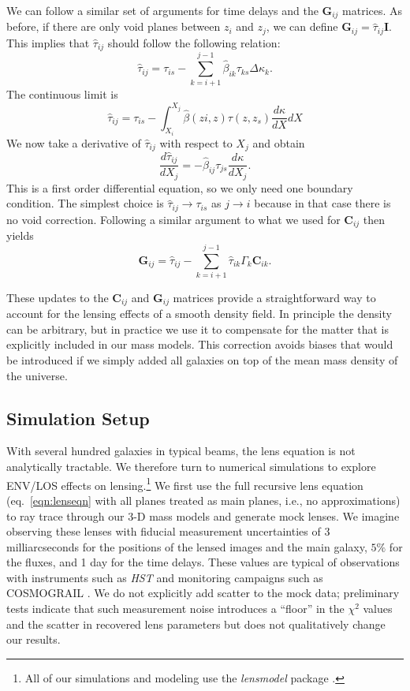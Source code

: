 \documentclass{emulateapj}
\newcommand\C[0]{\mathbf{C}}
\newcommand\I[0]{\mathbf{I}}
\newcommand\G[0]{\mathbf{G}}
\newcommand\betahat{\hat{\beta}}
\newcommand\tauhat{\hat{\tau}}
\begin{document}
We can follow a similar set of arguments for time delays and the $\G_{i j}$ matrices. As before, if there are only void planes between $z_i$ and $z_j$, we can define $\G_{i j} = \tauhat_{i j} \I$. This implies that $\tauhat_{i j}$ should follow the following relation:
\begin{equation}
\tauhat_{i j} = \tau_{i s} - \sum\limits_{k = i + 1}^{j - 1}\betahat_{i k} \tau_{k s} \Delta \kappa_k.
\end{equation}
The continuous limit is
\begin{equation}
\tauhat_{i j}  = \tau_{i s} - \int_{X_i}^{X_j} \betahat(zi, z) \tau(z, z_s) \frac{d \kappa}{d X} dX
\end{equation}
We now take a derivative of $\tauhat_{i j}$ with respect to $X_j$ and obtain
\begin{equation}
\frac{d \tauhat_{i j}}{d X_j}  = -\betahat_{i j} \tau_{j s} \frac{d \kappa}{d X_j}. 
\end{equation}
This is a first order differential equation, so we only need one boundary condition. The simplest choice is $\tauhat_{i j} \rightarrow \tau_{i s}$ as $j \rightarrow i$ because in that case there is no void correction.  Following a similar argument to what we used for $\C_{i j}$ then yields 
\begin{equation}
\G_{i j} = \tauhat_{i j} - \sum\limits_{k = i + 1}^{j -1} \tauhat_{i k} \Gamma_k \C_{i k}.
\end{equation}

These updates to the $\C_{i j}$ and $\G_{i j}$ matrices provide a straightforward way to account for the lensing effects of a smooth density field.  In principle the density can be arbitrary, but in practice we use it to compensate for the matter that is explicitly included in our mass models.  This correction avoids biases that would be introduced if we simply added all galaxies on top of the mean mass density of the universe.

\subsection{Simulation Setup} \label{sec:setup}

With several hundred galaxies in typical beams, the lens equation is not analytically tractable.  We therefore turn to numerical simulations to explore ENV/LOS effects on lensing.\footnote{All of our simulations and modeling use the \emph{lensmodel} package \citep{Keeton01}.}  We first use the full recursive lens equation (eq.\ \ref{eqn:lenseqn} with all planes treated as main planes, i.e., no approximations) to ray trace through our 3-D mass models and generate mock lenses.  We imagine observing these lenses with fiducial measurement uncertainties of 3 milliarcseconds for the positions of the lensed images and the main galaxy, $5\%$ for the fluxes, and 1 day for the time delays. These values are typical of observations with instruments such as \emph{HST} and monitoring campaigns such as COSMOGRAIL \citep{Eigenbrod05}. We do not explicitly add scatter to the mock data; preliminary tests indicate that such measurement noise introduces a ``floor'' in the $\chi^2$ values and the scatter in recovered lens parameters but does not qualitatively change our results.
\end{document}

